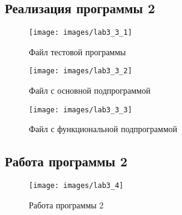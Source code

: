     \subsection{Реализация программы 2}
    \begin{figure}[H]
        \centering
        \texttt{[image: images/lab3\_3\_1]}
        \caption{Файл тестовой программы}
        \label{fig:code_2}
    \end{figure}

    \begin{figure}[H]
        \centering
        \texttt{[image: images/lab3\_3\_2]}
        \caption{Файл с основной подпрограммой}
        \label{fig:code_3}
    \end{figure}

    \begin{figure}[H]
        \centering
        \texttt{[image: images/lab3\_3\_3]}
        \caption{Файл с функциональной подпрограммой}
        \label{fig:code_4}
    \end{figure}



    \subsection{Работа программы 2}
    \begin{figure}[H]
        \centering
        \texttt{[image: images/lab3\_4]}
        \caption{Работа программы 2}
        \label{fig:debug_2}
    \end{figure}

